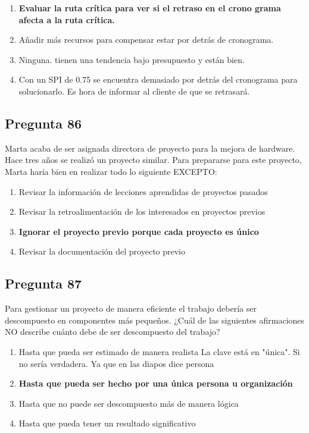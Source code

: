 \documentclass[11pt,a4paper]{article}
\begin{document}
\begin{enumerate}[label=\alph*)]
  \item \textbf{Evaluar la ruta crítica para ver si el retraso en el crono grama afecta a la ruta crítica.}
  \item Añadir más recursos para compensar estar por detrás de cronograma.
  \item Ninguna. tienen una tendencia bajo presupuesto y están bien.
  \item Con un SPI de 0.75 se encuentra demasiado por detrás del cronograma para solucionarlo. Es hora de informar al cliente de que se retrasará.
\end{enumerate}

\subsection*{Pregunta 86}
Marta acaba de ser asignada directora de proyecto para la mejora de hardware. Hace tres años se realizó un proyecto similar. Para prepararse para este proyecto, Marta haría bien en realizar todo lo siguiente EXCEPTO:

\begin{enumerate}[label=\alph*)]
  \item Revisar la información de lecciones aprendidas de proyectos pasados
  \item Revisar la retroalimentación de los interesados en proyectos previos
  \item \textbf{Ignorar el proyecto previo porque cada proyecto es único}
  \item Revisar la documentación del proyecto previo
\end{enumerate}

\subsection*{Pregunta 87}
Para gestionar un proyecto de manera eficiente el trabajo debería ser descompuesto en componentes más pequeños. ¿Cuál de las siguientes afirmaciones NO describe cuánto debe de ser descompuesto del trabajo?

\begin{enumerate}[label=\alph*)]
  \item Hasta que pueda ser estimado de manera realista La clave está en "única". Si no sería verdadera. Ya que en las diapos dice persona
  \item \textbf{Hasta que pueda ser hecho por una única persona u organización}
  \item Hasta que no puede ser descompuesto más de manera lógica
  \item Hasta que pueda tener un resultado significativo
\end{enumerate}
\end{document}
